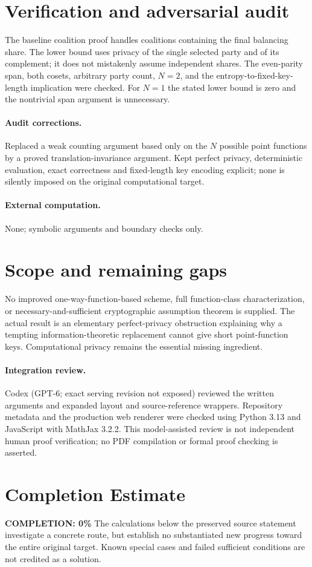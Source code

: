 \documentclass[11pt]{article}
\begin{document}
\section{Verification and adversarial audit}
The baseline coalition proof handles coalitions containing the final balancing share. The lower bound uses privacy of the single selected party and of its complement; it does not mistakenly assume independent shares. The even-parity span, both cosets, arbitrary party count, $N=2$, and the entropy-to-fixed-key-length implication were checked. For $N=1$ the stated lower bound is zero and the nontrivial span argument is unnecessary.
\paragraph{Audit corrections.} Replaced a weak counting argument based only on the $N$ possible point functions by a proved translation-invariance argument. Kept perfect privacy, deterministic evaluation, exact correctness and fixed-length key encoding explicit; none is silently imposed on the original computational target.
\paragraph{External computation.} None; symbolic arguments and boundary checks only.
\section{Scope and remaining gaps}
No improved one-way-function-based scheme, full function-class characterization, or necessary-and-sufficient cryptographic assumption theorem is supplied. The actual result is an elementary perfect-privacy obstruction explaining why a tempting information-theoretic replacement cannot give short point-function keys. Computational privacy remains the essential missing ingredient.
\paragraph{Integration review.} Codex (GPT-6; exact serving revision not exposed) reviewed the written arguments and expanded layout and source-reference wrappers. Repository metadata and the production web renderer were checked using Python 3.13 and JavaScript with MathJax 3.2.2. This model-assisted review is not independent human proof verification; no PDF compilation or formal proof checking is asserted.

\section{Completion Estimate}
\noindent\textbf{COMPLETION: 0\%}
The calculations below the preserved source statement investigate a concrete route,
but establish no substantiated new progress toward the entire original target.
Known special cases and failed sufficient conditions are not credited as a solution.
\end{document}
